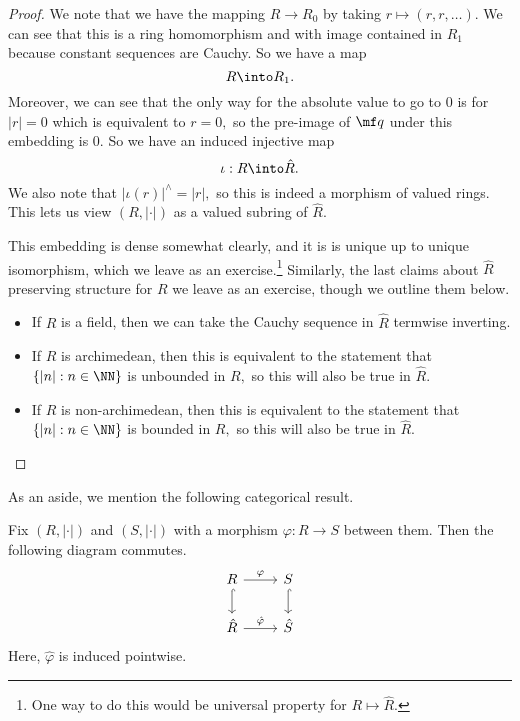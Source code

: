 \documentclass[../notes.tex]{subfiles}
\begin{document}
\begin{proof}
	We note that we have the mapping $R\to R_0$ by taking $r\mapsto(r,r,\ldots).$ We can see that this is a ring homomorphism and with image contained in $R_1$ because constant sequences are Cauchy. So we have a map
	\[R\into R_1.\]
	Moreover, we can see that the only way for the absolute value to go to $0$ is for $|r|=0$ which is equivalent to $r=0,$ so the pre-image of $\mf q$ under this embedding is $0.$ So we have an induced injective map
	\[\iota:R\into\hat R.\]
	We also note that $|\iota(r)|^\wedge=|r|,$ so this is indeed a morphism of valued rings. This lets us view $(R,|\cdot|)$ as a valued subring of $\hat R.$

	This embedding is dense somewhat clearly, and it is is unique up to unique isomorphism, which we leave as an exercise.\footnote{One way to do this would be universal property for $R\mapsto\hat R.$} Similarly, the last claims about $\hat R$ preserving structure for $R$ we leave as an exercise, though we outline them below.
	\begin{itemize}
		\item If $R$ is a field, then we can take the Cauchy sequence in $\hat R$ termwise inverting.
		\item If $R$ is archimedean, then this is equivalent to the statement that $\{|n|:n\in\NN\}$ is unbounded in $R,$ so this will also be true in $\hat R.$
		\item If $R$ is non-archimedean, then this is equivalent to the statement that $\{|n|:n\in\NN\}$ is bounded in $R,$ so this will also be true in $\hat R.$
		\qedhere
	\end{itemize}
\end{proof}
As an aside, we mention the following categorical result.
\begin{proposition}
	Fix $(R,|\cdot|)$ and $(S,|\cdot|)$ with a morphism $\varphi:R\to S$ between them. Then the following diagram commutes.
	\[\begin{tikzcd}
		R & S \\
		{\hat R} & {\hat S}
		\arrow["\varphi", from=1-1, to=1-2]
		\arrow["\hat\varphi", from=2-1, to=2-2]
		\arrow[hook, from=1-1, to=2-1]
		\arrow[hook, from=1-2, to=2-2]
	\end{tikzcd}\]
	Here, $\hat\varphi$ is induced pointwise.
\end{proposition}
\end{document}
